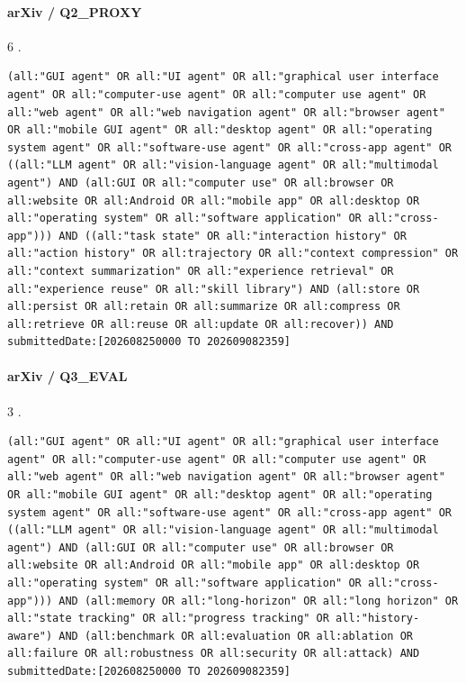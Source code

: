 \noindent\begin{minipage}{\linewidth}
\paragraph{arXiv / Q2\_PROXY}
6 .
\begin{lstlisting}
(all:"GUI agent" OR all:"UI agent" OR all:"graphical user interface agent" OR all:"computer-use agent" OR all:"computer use agent" OR all:"web agent" OR all:"web navigation agent" OR all:"browser agent" OR all:"mobile GUI agent" OR all:"desktop agent" OR all:"operating system agent" OR all:"software-use agent" OR all:"cross-app agent" OR ((all:"LLM agent" OR all:"vision-language agent" OR all:"multimodal agent") AND (all:GUI OR all:"computer use" OR all:browser OR all:website OR all:Android OR all:"mobile app" OR all:desktop OR all:"operating system" OR all:"software application" OR all:"cross-app"))) AND ((all:"task state" OR all:"interaction history" OR all:"action history" OR all:trajectory OR all:"context compression" OR all:"context summarization" OR all:"experience retrieval" OR all:"experience reuse" OR all:"skill library") AND (all:store OR all:persist OR all:retain OR all:summarize OR all:compress OR all:retrieve OR all:reuse OR all:update OR all:recover)) AND submittedDate:[202608250000 TO 202609082359]
\end{lstlisting}
\end{minipage}\par\medskip
\noindent\begin{minipage}{\linewidth}
\paragraph{arXiv / Q3\_EVAL}
3 .
\begin{lstlisting}
(all:"GUI agent" OR all:"UI agent" OR all:"graphical user interface agent" OR all:"computer-use agent" OR all:"computer use agent" OR all:"web agent" OR all:"web navigation agent" OR all:"browser agent" OR all:"mobile GUI agent" OR all:"desktop agent" OR all:"operating system agent" OR all:"software-use agent" OR all:"cross-app agent" OR ((all:"LLM agent" OR all:"vision-language agent" OR all:"multimodal agent") AND (all:GUI OR all:"computer use" OR all:browser OR all:website OR all:Android OR all:"mobile app" OR all:desktop OR all:"operating system" OR all:"software application" OR all:"cross-app"))) AND (all:memory OR all:"long-horizon" OR all:"long horizon" OR all:"state tracking" OR all:"progress tracking" OR all:"history-aware") AND (all:benchmark OR all:evaluation OR all:ablation OR all:failure OR all:robustness OR all:security OR all:attack) AND submittedDate:[202608250000 TO 202609082359]
\end{lstlisting}
\end{minipage}\par\medskip
\paragraph{}
